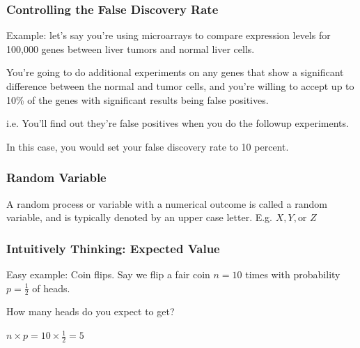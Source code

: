 \documentclass[slides]{beamer}
\newcommand{\blue}[1]{\textcolor{blue2}{#1}}
\begin{document}
\begin{frame}
\frametitle{Controlling the False Discovery Rate}

Example: let's say you're using microarrays to compare expression levels for 100,000 genes between liver tumors and normal liver cells.

\pause
\vspace{0.25cm}

You're going to do additional experiments on any genes that show a significant difference between the normal and tumor cells, and \blue{you're willing to accept up to 10\% of the genes with significant results being false positives}.  

\pause
\vspace{0.25cm}

i.e. You'll find out they're false positives when you do the followup experiments. 

\pause
\vspace{0.25cm}

In this case, you would set your false discovery rate to 10 percent.



\end{frame}






\begin{frame}[fragile]
\frametitle{Random Variable}

A random process or variable with a numerical outcome is called a \blue{random variable}, and is typically denoted by an upper case letter.  E.g. $X, Y, \mbox{or } Z$

\end{frame}



\begin{frame}
\frametitle{Intuitively Thinking: Expected Value}
 
Easy example:  Coin flips.  Say we flip a fair coin $n=10$ times with probability $p=\frac{1}{2}$ of heads.

\pause
\vspace{0.5cm}

How many heads do you \blue{expect} to get?

\vspace{0.5cm}

$n \times p = 10 \times \frac{1}{2} = 5$

\end{frame}
\end{document}
